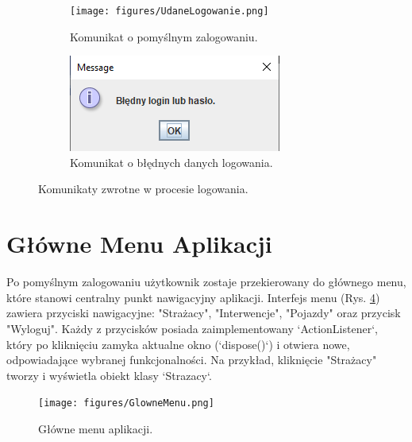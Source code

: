 \begin{figure}[H]
	\centering
	\begin{subfigure}{0.48\textwidth}
		\centering
		\texttt{[image: figures/UdaneLogowanie.png]}
		\caption{Komunikat o pomyślnym zalogowaniu.}
		\label{fig:logowanie_sukces}
	\end{subfigure}
	\hfill
	\begin{subfigure}{0.48\textwidth}
		\centering
		\includegraphics[width=\linewidth]{figures/BladLogowania.png}
		\caption{Komunikat o błędnych danych logowania.}
		\label{fig:logowanie_blad}
	\end{subfigure}
	\caption{Komunikaty zwrotne w procesie logowania.}
	\label{fig:komunikaty_logowania}
\end{figure}

\section{Główne Menu Aplikacji}
\label{sec:glowne_menu}

Po pomyślnym zalogowaniu użytkownik zostaje przekierowany do głównego menu, które stanowi centralny punkt nawigacyjny aplikacji. Interfejs menu (Rys. \ref{fig:menu}) zawiera przyciski nawigacyjne: "Strażacy", "Interwencje", "Pojazdy" oraz przycisk "Wyloguj". Każdy z przycisków posiada zaimplementowany `ActionListener`, który po kliknięciu zamyka aktualne okno (`dispose()`) i otwiera nowe, odpowiadające wybranej funkcjonalności. Na przykład, kliknięcie "Strażacy" tworzy i wyświetla obiekt klasy `Strazacy`.

\begin{figure}[H]
	\centering
	\texttt{[image: figures/GlowneMenu.png]}
	\caption{Główne menu aplikacji.}
	\label{fig:menu}
\end{figure}

